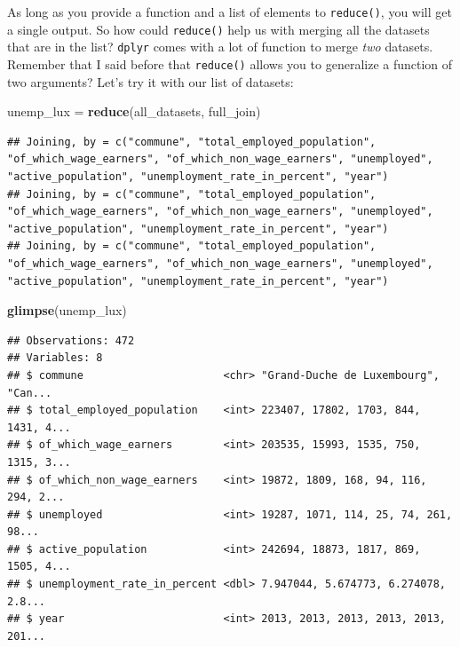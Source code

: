 \documentclass[]{gitbook}
\newenvironment{Shaded}{\begin{snugshade}}{\end{snugshade}}
\newcommand{\KeywordTok}[1]{\textcolor[rgb]{0.13,0.29,0.53}{\textbf{#1}}}
\newcommand{\NormalTok}[1]{#1}
\newcommand{\StringTok}[1]{\textcolor[rgb]{0.31,0.60,0.02}{#1}}
\theoremstyle{definition}
\theoremstyle{definition}
\theoremstyle{definition}
\theoremstyle{remark}
\begin{document}
As long as you provide a function and a list of elements to
\texttt{reduce()}, you will get a single output. So how could
\texttt{reduce()} help us with merging all the datasets that are in the
list? \texttt{dplyr} comes with a lot of function to merge \emph{two}
datasets. Remember that I said before that \texttt{reduce()} allows you
to generalize a function of two arguments? Let's try it with our list of
datasets:

\begin{Shaded}
\begin{Highlighting}[]
\NormalTok{unemp_lux =}\StringTok{ }\KeywordTok{reduce}\NormalTok{(all_datasets, full_join)}
\end{Highlighting}
\end{Shaded}

\begin{verbatim}
## Joining, by = c("commune", "total_employed_population", "of_which_wage_earners", "of_which_non_wage_earners", "unemployed", "active_population", "unemployment_rate_in_percent", "year")
## Joining, by = c("commune", "total_employed_population", "of_which_wage_earners", "of_which_non_wage_earners", "unemployed", "active_population", "unemployment_rate_in_percent", "year")
## Joining, by = c("commune", "total_employed_population", "of_which_wage_earners", "of_which_non_wage_earners", "unemployed", "active_population", "unemployment_rate_in_percent", "year")
\end{verbatim}

\begin{Shaded}
\begin{Highlighting}[]
\KeywordTok{glimpse}\NormalTok{(unemp_lux)}
\end{Highlighting}
\end{Shaded}

\begin{verbatim}
## Observations: 472
## Variables: 8
## $ commune                      <chr> "Grand-Duche de Luxembourg", "Can...
## $ total_employed_population    <int> 223407, 17802, 1703, 844, 1431, 4...
## $ of_which_wage_earners        <int> 203535, 15993, 1535, 750, 1315, 3...
## $ of_which_non_wage_earners    <int> 19872, 1809, 168, 94, 116, 294, 2...
## $ unemployed                   <int> 19287, 1071, 114, 25, 74, 261, 98...
## $ active_population            <int> 242694, 18873, 1817, 869, 1505, 4...
## $ unemployment_rate_in_percent <dbl> 7.947044, 5.674773, 6.274078, 2.8...
## $ year                         <int> 2013, 2013, 2013, 2013, 2013, 201...
\end{verbatim}
\end{document}

